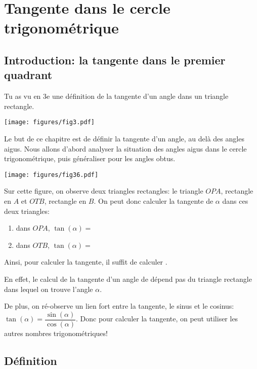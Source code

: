 \documentclass[
  a4paper,
  DIV=11,
  numbers=noendperiod,
  oneside]{scrreprt}
\theoremstyle{definition}
\theoremstyle{definition}
\theoremstyle{plain}
\theoremstyle{definition}
\theoremstyle{remark}
\begin{document}
\section{Tangente dans le cercle
trigonométrique}\label{tangente-dans-le-cercle-trigonomuxe9trique}

\subsection{Introduction: la tangente dans le premier
quadrant}\label{introduction-la-tangente-dans-le-premier-quadrant}

Tu as vu en 3e une définition de la tangente d'un angle dans un triangle
rectangle.

\begin{center}
\texttt{[image: figures/fig3.pdf]}
\end{center}

Le but de ce chapitre est de définir la tangente d'un angle, au delà des
angles aigus. Nous allons d'abord analyser la situation des angles aigus
dans le cercle trigonométrique, puis généraliser pour les angles obtus.

\begin{center}
\texttt{[image: figures/fig36.pdf]}
\end{center}

Sur cette figure, on observe deux triangles rectangles: le triangle
\(OPA\), rectangle en \(A\) et \(OTB\), rectangle en \(B\). On peut donc
calculer la tangente de \(\alpha\) dans ces deux triangles:

\begin{enumerate}
\def\labelenumi{\arabic{enumi})}
\item
  dans \(OPA\), \(\tan(\alpha)=\)
\item
  dans \(OTB\), \(\tan(\alpha)=\)
\end{enumerate}

Ainsi, pour calculer la tangente, il suffit de calculer \dotfill.

En effet, le calcul de la tangente d'un angle de dépend pas du triangle
rectangle dans lequel on trouve l'angle \(\alpha\).

De plus, on ré-observe un lien fort entre la tangente, le sinus et le
cosinus: \(\tan(\alpha)=\dfrac{\sin(\alpha)}{\cos(\alpha)}\). Donc pour
calculer la tangente, on peut utiliser les autres nombres
trigonométriques!

\subsection{Définition}\label{duxe9finition-1}
\end{document}
